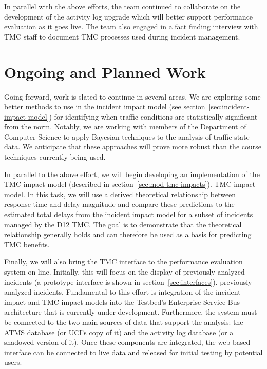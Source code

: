 In parallel with the above efforts, the team continued to collaborate on the
development of the activity log upgrade which will better support performance
evaluation as it goes live.  The team also engaged in a fact finding interview
with TMC staff to document TMC processes used during incident management.


\section*{Ongoing and Planned Work}
\label{execsum-ongoing-work}

Going forward, work is slated to continue in several areas.  We are exploring
some better methods to use in the incident impact model
%
\iffull
(see section~\ref{sec:incident-impact-model})
\fi
%
for identifying when traffic conditions are statistically significant from the
norm.  Notably, we are working with members of the Department of Computer
Science to apply Bayesian techniques to the analysis of traffic state data.  We
anticipate that these approaches will prove more robust than the course
techniques currently being used.

In parallel to the above effort, we will begin developing an implementation of
the
\iffull%
TMC impact model (described in section~\ref{sec:mod-tmc-impacts}).%
\else%
TMC impact model.%
\fi
%
In this task, we will use a derived theoretical relationship between response
time and delay magnitude and compare these predictions to the estimated total
delays from the incident impact model for a subset of incidents managed by the
D12 TMC.  The goal is to demonstrate that the theoretical relationship generally
holds and can therefore be used as a basis for predicting TMC benefits.

Finally, we will also bring the TMC interface to the performance evaluation
system on-line.  Initially, this will focus on the display of
%
\iffull%
previously analyzed incidents (a prototype interface is shown in section~\ref{sec:interfaces}).%
\else%
previously analyzed incidents.%
\fi%
%
Fundamental to this effort is integration of the incident impact and TMC impact
models into the Testbed's Enterprise Service Bus architecture that is currently
under development.  Furthermore, the system must be connected to the two main
sources of data that support the analysis: the ATMS database (or UCI's copy of
it) and the activity log database (or a shadowed version of it).  Once these
components are integrated, the web-based interface can be connected to live data
and released for initial testing by potential users.



